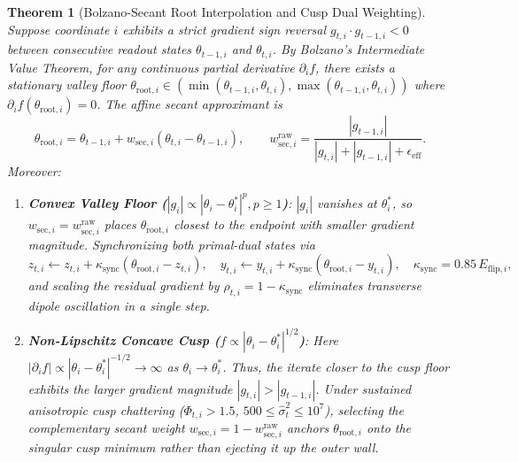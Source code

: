 \documentclass[10pt,twocolumn,letterpaper]{article}
\newtheorem{theorem}{Theorem}[section]
\theoremstyle{definition}
\theoremstyle{remark}
\newcommand{\epseff}{\epsilon_{\mathrm{eff}}}
\begin{document}
\begin{theorem}[Bolzano-Secant Root Interpolation and Cusp Dual Weighting]
\label{thm:bolzano_secant}
Suppose coordinate $i$ exhibits a strict gradient sign reversal $g_{t,i}\cdot g_{t-1,i} < 0$ between consecutive readout states $\theta_{t-1,i}$ and $\theta_{t,i}$. By Bolzano's Intermediate Value Theorem, for any continuous partial derivative $\partial_i f$, there exists a stationary valley floor $\theta_{\mathrm{root},i} \in (\min(\theta_{t-1,i}, \theta_{t,i}), \max(\theta_{t-1,i}, \theta_{t,i}))$ where $\partial_i f(\theta_{\mathrm{root},i}) = 0$. The affine secant approximant is
\begin{equation}
  \theta_{\mathrm{root},i} = \theta_{t-1,i} + w_{\mathrm{sec},i}\left(\theta_{t,i} - \theta_{t-1,i}\right), \qquad w_{\mathrm{sec},i}^{\mathrm{raw}} = \frac{|g_{t-1,i}|}{|g_{t,i}| + |g_{t-1,i}| + \epseff}.
  \label{eq:secant_root}
\end{equation}
Moreover:
\begin{enumerate}[leftmargin=*,nosep,label=(\roman*)]
  \item \textbf{Convex Valley Floor ($|g_i| \propto |\theta_i - \theta_i^*|^p, p \ge 1$)}: $|g_i|$ vanishes at $\theta_i^*$, so $w_{\mathrm{sec},i} = w_{\mathrm{sec},i}^{\mathrm{raw}}$ places $\theta_{\mathrm{root},i}$ closest to the endpoint with smaller gradient magnitude. Synchronizing both primal-dual states via
  \begin{equation}
    z_{t,i} \leftarrow z_{t,i} + \kappa_{\mathrm{sync}}\left(\theta_{\mathrm{root},i} - z_{t,i}\right), \quad y_{t,i} \leftarrow y_{t,i} + \kappa_{\mathrm{sync}}\left(\theta_{\mathrm{root},i} - y_{t,i}\right), \quad \kappa_{\mathrm{sync}} = 0.85\, E_{\mathrm{flip},i},
    \label{eq:manifold_sync}
  \end{equation}
  and scaling the residual gradient by $\rho_{t,i} = 1 - \kappa_{\mathrm{sync}}$ eliminates transverse dipole oscillation in a single step.
  \item \textbf{Non-Lipschitz Concave Cusp ($f \propto |\theta_i - \theta_i^*|^{1/2}$)}: Here $|\partial_i f| \propto |\theta_i - \theta_i^*|^{-1/2} \to \infty$ as $\theta_i \to \theta_i^*$. Thus, the iterate \emph{closer} to the cusp floor exhibits the \emph{larger} gradient magnitude $|g_{t,i}| > |g_{t-1,i}|$. Under sustained anisotropic cusp chattering ($\Phi_{t,i} > 1.5$, $500 \le \hat{\sigma}_t^2 \le 10^7$), selecting the complementary secant weight $w_{\mathrm{sec},i} = 1 - w_{\mathrm{sec},i}^{\mathrm{raw}}$ anchors $\theta_{\mathrm{root},i}$ onto the singular cusp minimum rather than ejecting it up the outer wall.

\end{enumerate}
\end{theorem}
\end{document}
